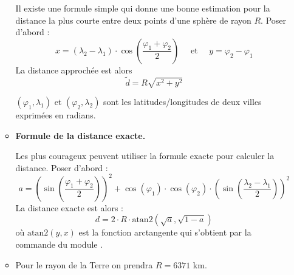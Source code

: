 \documentclass[11pt,class=report,crop=false]{standalone}
\begin{document}
\begin{activite}
\begin{enumerate}
\begin{itemize}
	Il existe une formule simple qui donne une bonne estimation pour la distance la plus courte entre deux points d'une sphère de rayon $R$.
    Poser d'abord :
    $$x =   (\lambda_2-\lambda_1)\cdot  \cos\left( \frac{\varphi_1+\varphi_2}{2} \right)
    \quad\text{ et }\quad 
    y = \varphi_2-\varphi_1$$
	La distance approchée est alors 
	$$ \tilde d = R \sqrt{x^2 + y^2}$$	
	
	$(\varphi_1,\lambda_1)$ et $(\varphi_2,\lambda_2)$ sont les latitudes/longitudes de deux villes exprimées en radians.
	
	\item \textbf{Formule de la distance exacte.}
	
	Les plus courageux peuvent utiliser la formule exacte pour calculer la distance.
	Poser d'abord : 
	$$a = \left(\sin\left(\frac{\varphi_1+\varphi_2}{2}\right)\right)^2 + \cos(\varphi_1)\cdot \cos(\varphi_2) \cdot \left(\sin\left( \frac{\lambda_2-\lambda_1}{2} \right)\right)^2$$
    La distance exacte est alors :
    $$d = 2 \cdot R \cdot \text{atan2}\left(\sqrt{a},\sqrt{1-a}\right)$$
    où $\text{atan2}(y,x)$ est la fonction \og{}arctangente\fg{} qui s'obtient par la commande  du module .	
	
	\item Pour le rayon de la Terre on prendra $R = 6371$ km.

\end{itemize}
  
\end{enumerate}   
     
\end{activite}
\end{document}
